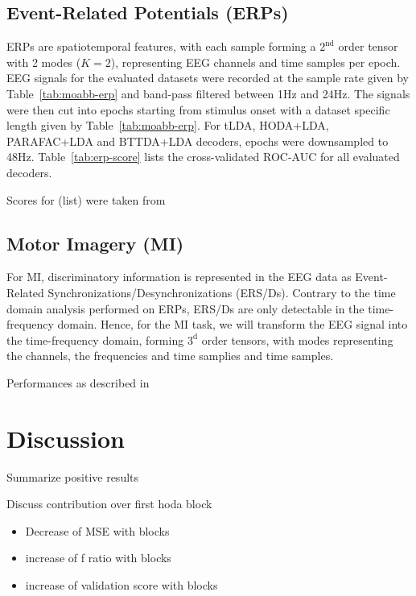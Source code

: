 \documentclass[twocolumn]{article}
\begin{document}
\subsection{Event-Related Potentials (ERPs)}
ERPs are spatiotemporal features, with each sample forming a $2^\text{nd}$
order tensor with 2 modes ($K=2$), representing EEG channels and time samples
per epoch.
EEG signals for the evaluated datasets were recorded at the sample rate given
by Table~\ref{tab:moabb-erp} and band-pass filtered between 1Hz
and 24Hz.
The signals were then cut into epochs starting from stimulus onset with a
dataset specific length given by Table~\ref{tab:moabb-erp}.
For tLDA, HODA+LDA, PARAFAC+LDA and BTTDA+LDA decoders, epochs were downsampled to 48Hz.
Table~\ref{tab:erp-score} lists the cross-validated ROC-AUC for all evaluated
decoders.
\begin{table*}
  \footnotesize
  
  \caption{Scores for (list) were taken from \cite{Chevallier2024}}
  \label{tab:erp-score}
\end{table*}


\subsection{Motor Imagery (MI)}
For MI, discriminatory information is represented in the EEG data as
Event-Related Synchronizations/Desynchronizations (ERS/Ds).
Contrary to the time domain analysis performed on ERPs, ERS/Ds are only
detectable in the time-frequency domain.
Hence, for the MI task, we will transform the EEG signal into the
time-frequency domain, forming $3^\text{d}$ order tensors, with modes
representing the channels, the frequencies and time samplies and time samples.

\begin{table}
  \caption{Performances as described in \cite{Chevallier2024}}
\end{table}

\section{Discussion}
Summarize positive results

Discuss contribution over first hoda block
\begin{figure*}
  
\end{figure*}
\begin{itemize}
  \item Decrease of MSE with blocks
  \item increase of f ratio with blocks
  \item increase of validation score with blocks
\end{itemize}
\end{document}
